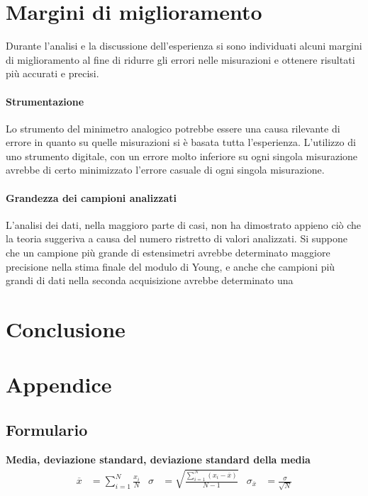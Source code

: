 \documentclass[a4paper,11pt,oneside]{article}
\begin{document}











\section{Margini di miglioramento}
Durante l'analisi e la discussione dell'esperienza si sono individuati alcuni margini di miglioramento al fine di ridurre gli errori nelle misurazioni e ottenere risultati più accurati e precisi.
\paragraph{Strumentazione}
Lo strumento del minimetro analogico potrebbe essere una causa rilevante di errore in quanto su quelle misurazioni si è basata tutta l'esperienza. L'utilizzo di uno strumento digitale, con un errore molto inferiore su ogni singola misurazione avrebbe di certo minimizzato l'errore casuale di ogni singola misurazione.
\paragraph{Grandezza dei campioni analizzati}
L'analisi dei dati, nella maggioro parte di casi, non ha dimostrato appieno ciò che la teoria suggeriva a causa del numero ristretto di valori analizzati. Si suppone che un campione più grande di estensimetri avrebbe determinato maggiore precisione nella stima finale del modulo di Young, e anche che campioni più grandi di dati nella seconda acquisizione avrebbe determinato una 


\section{Conclusione}

\section{Appendice}

\subsection{Formulario}
\textbf{Media, deviazione standard, deviazione standard della media}
\begin{align*}
        \overline{x}&=\sum\limits_{i=1}^{N} \frac{x_{i}}{N}&
        \sigma&=\sqrt{\frac{\sum\limits_{i=1}^{N} (x_{i}-\overline{x})}{N-1}}&
        \sigma_{\overline{x}}&=\frac{\sigma}{\sqrt{N}}
\end{align*}\\
\end{document}
